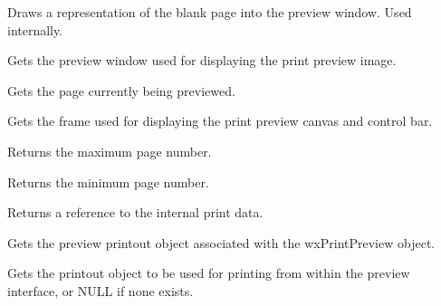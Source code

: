 \label{wxprintpreviewdrawblankpage}


Draws a representation of the blank page into the preview window. Used
internally.

\label{wxprintpreviewgetcanvas}


Gets the preview window used for displaying the print preview image.

\label{wxprintpreviewgetcurrentpage}


Gets the page currently being previewed.

\label{wxprintpreviewgetframe}


Gets the frame used for displaying the print preview canvas
and control bar.

\label{wxprintpreviewgetmaxpage}


Returns the maximum page number.

\label{wxprintpreviewgetminpage}


Returns the minimum page number.

\label{wxprintpreviewgetprintdata}


Returns a reference to the internal print data.

\label{wxprintpreviewgetprintout}


Gets the preview printout object associated with the wxPrintPreview object.

\label{wxprintpreviewgetprintoutforprinting}


Gets the printout object to be used for printing from within the preview interface,
or NULL if none exists.

